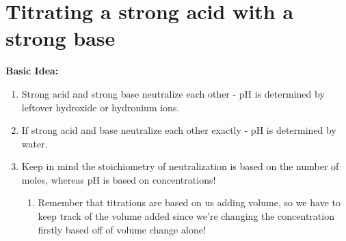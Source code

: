 \documentclass{article}  %
\begin{document}
\section*{Titrating a strong acid with a strong base}
\textbf{Basic Idea:}
\begin{enumerate}
    \item Strong acid and strong base neutralize each other - pH is determined by leftover hydroxide or hydronium ions.
    \item If strong acid and base neutralize each other exactly - pH is determined by water.
    \item Keep in mind the stoichiometry of neutralization is based on the number of moles, whereas pH is based on concentrations!
    \begin{enumerate}
        \item Remember that titrations are based on us adding volume, so we have to keep track of the volume added since we're changing the concentration firstly based off of volume change alone!
    \end{enumerate}
\end{enumerate}
\end{document}
